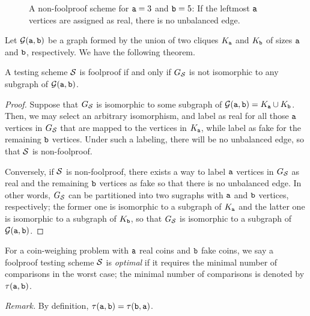 \begin{figure}[!htb]
   \centering
     \vspace*{2.5ex}
    \caption{A non-foolproof scheme for $\mathtt{a} = 3$ and $\mathtt{b} = 5$:  
                 If the leftmost $\mathtt{a}$ vertices are assigned as real, there is no unbalanced edge.} \label{fig:nonfoolproof}
\end{figure}

\medskip

Let ${\cal G}(\mathtt{a},\mathtt{b})$ be a graph formed by the union of two cliques $K_{\mathtt{a}}$ and $K_{\mathtt{b}}$ of sizes $\mathtt{a}$ and $\mathtt{b}$, respectively.  We have the following theorem.

\begin{theorem} \label{thm:graph}
A testing scheme ${\cal S}$ is foolproof if and only if $G_{\cal S}$ is not isomorphic to any subgraph of ${\cal G}(\mathtt{a},\mathtt{b})$. 
\end{theorem}
\begin{proof}
Suppose that $G_{\cal S}$ is isomorphic to some subgraph of ${\cal G}(\mathtt{a},\mathtt{b}) = K_{\mathtt{a}} \cup K_{\mathtt{b}}$. 
Then, we may select an arbitrary isomorphism, and label as real for all those $\mathtt{a}$ vertices in $G_{\cal S}$ that are mapped to the vertices in $K_{\mathtt{a}}$, while label as fake for the remaining $\mathtt{b}$ vertices.  Under such a labeling, there will be no unbalanced edge, so that ${\cal S}$ is non-foolproof.

\smallskip

Conversely, if ${\cal S}$ is non-foolproof, there exists a way to label $\mathtt{a}$ vertices in $G_{\cal S}$ as real and the remaining $\mathtt{b}$ vertices as fake so that there is no unbalanced edge.  In other words, $G_{\cal S}$ can be partitioned into two sugraphs with $\mathtt{a}$ and $\mathtt{b}$ vertices, respectively;  the former one is isomorphic to a subgraph of $K_{\mathtt{a}}$ and the latter one is isomorphic to a subgraph of $K_{\mathtt{b}}$,  so that $G_{\cal S}$ is isomorphic to a subgraph of ${\cal G}(\mathtt{a},\mathtt{b})$.
\end{proof}

\begin{definition}
For a coin-weighing problem with $\mathtt{a}$ real coins and $\mathtt{b}$ fake coins, 
we say a foolproof testing scheme ${\cal S}$ is \emph{optimal} if it requires the minimal number of 
comparisons in the worst case;  the minimal number of comparisons is denoted by $\tau(\mathtt{a},\mathtt{b})$.
\end{definition}
\noindent
{\it Remark.} By  definition, $\tau(\mathtt{a},\mathtt{b}) = \tau(\mathtt{b},\mathtt{a})$.

\bigskip

